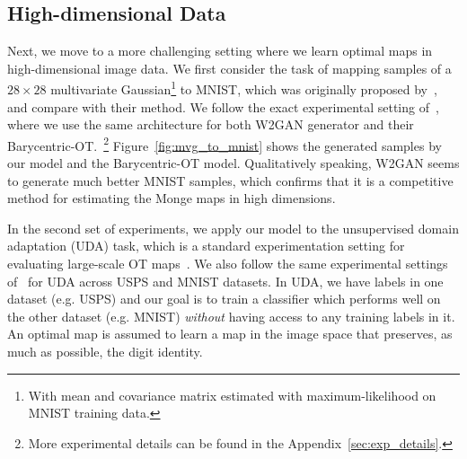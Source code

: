 \documentclass[runningheads]{llncs}
\newcommand\mycitet[1]{\cite{#1}}
\begin{document}
\subsection{High-dimensional Data}

 Next, we move to a more challenging setting where we learn optimal maps in high-dimensional image data. 
 We first consider the task of mapping samples of a $28\times 28$ multivariate Gaussian\footnote{With mean and covariance matrix estimated with maximum-likelihood on MNIST training data.} to MNIST, which was originally proposed by~\mycitet{Seguy2018LSOT}, and compare with their method. We follow the exact experimental setting of~\mycitet{Seguy2018LSOT}, where we use the same architecture for both W2GAN generator and their Barycentric-OT.~\footnote{More experimental details can be found in the Appendix~\ref{sec:exp_details}.}
 Figure~\ref{fig:mvg_to_mnist} shows the generated samples by our model and the Barycentric-OT model. Qualitatively speaking, W2GAN seems to generate much better MNIST samples, which confirms that it is a competitive method for estimating the Monge maps in high dimensions.
 

In the second set of experiments, we apply our model to the unsupervised domain adaptation (UDA) task, which is a standard experimentation setting for evaluating large-scale OT maps~\citep{courty2017optimal}. We also follow the same experimental settings of~\mycitet{Seguy2018LSOT} for UDA across USPS and MNIST datasets. 
In UDA, we have labels in one dataset (e.g. USPS) and our goal is to train a classifier which performs well on the other dataset (e.g. MNIST) \emph{without} having access to any training labels in it. An optimal map is assumed to learn a map in the image space that preserves, as much as possible, the digit identity.
 
\end{document}
